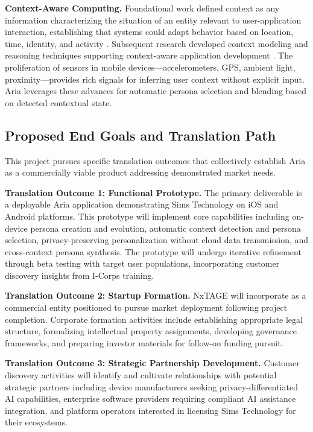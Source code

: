\documentclass[11pt]{article}
\begin{document}
\textbf{Context-Aware Computing.} Foundational work defined context as any information characterizing the situation of an entity relevant to user-application interaction, establishing that systems could adapt behavior based on location, time, identity, and activity \cite{dey2001understanding}. Subsequent research developed context modeling and reasoning techniques supporting context-aware application development \cite{bettini2010survey}. The proliferation of sensors in mobile devices---accelerometers, GPS, ambient light, proximity---provides rich signals for inferring user context without explicit input. Aria leverages these advances for automatic persona selection and blending based on detected contextual state.

\vspace*{-8pt}
\subsection{Proposed End Goals and Translation Path}
\vspace*{-8pt}
This project pursues specific translation outcomes that collectively establish Aria as a commercially viable product addressing demonstrated market needs.

\textbf{Translation Outcome 1: Functional Prototype.} The primary deliverable is a deployable Aria application demonstrating Sims Technology on iOS and Android platforms. This prototype will implement core capabilities including on-device persona creation and evolution, automatic context detection and persona selection, privacy-preserving personalization without cloud data transmission, and cross-context persona synthesis. The prototype will undergo iterative refinement through beta testing with target user populations, incorporating customer discovery insights from I-Corps training.

\textbf{Translation Outcome 2: Startup Formation.} NxTAGE will incorporate as a commercial entity positioned to pursue market deployment following project completion. Corporate formation activities include establishing appropriate legal structure, formalizing intellectual property assignments, developing governance frameworks, and preparing investor materials for follow-on funding pursuit.

\textbf{Translation Outcome 3: Strategic Partnership Development.} Customer discovery activities will identify and cultivate relationships with potential strategic partners including device manufacturers seeking privacy-differentiated AI capabilities, enterprise software providers requiring compliant AI assistance integration, and platform operators interested in licensing Sims Technology for their ecosystems.
\end{document}
